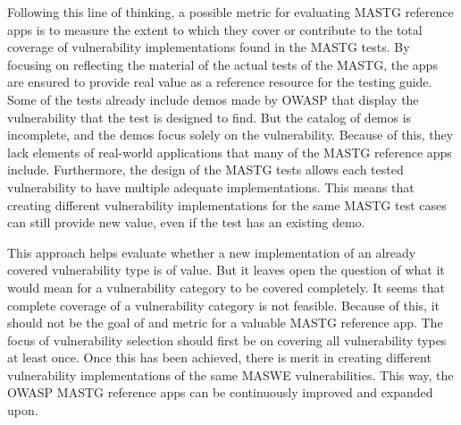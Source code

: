Following this line of thinking, a possible metric for evaluating MASTG reference apps is to measure the extent to which they cover or contribute to the total coverage of vulnerability implementations found in the MASTG tests. By focusing on reflecting the material of the actual tests of the MASTG, the apps are ensured to provide real value as a reference resource for the testing guide. Some of the tests already include demos made by OWASP that display the vulnerability that the test is designed to find. But the catalog of demos is incomplete, and the demos focus solely on the vulnerability. Because of this, they lack elements of real-world applications that many of the MASTG reference apps include. Furthermore, the design of the MASTG tests allows each tested vulnerability to have multiple adequate implementations. This means that creating different vulnerability implementations for the same MASTG test cases can still provide new value, even if the test has an existing demo. 

This approach helps evaluate whether a new implementation of an already covered vulnerability type is of value. But it leaves open the question of what it would mean for a vulnerability category to be covered completely. It seems that complete coverage of a vulnerability category is not feasible. Because of this, it should not be the goal of and metric for a valuable MASTG reference app. The focus of vulnerability selection should first be on covering all vulnerability types at least once. Once this has been achieved, there is merit in creating different vulnerability implementations of the same MASWE vulnerabilities. This way, the OWASP MASTG reference apps can be continuously improved and expanded upon.